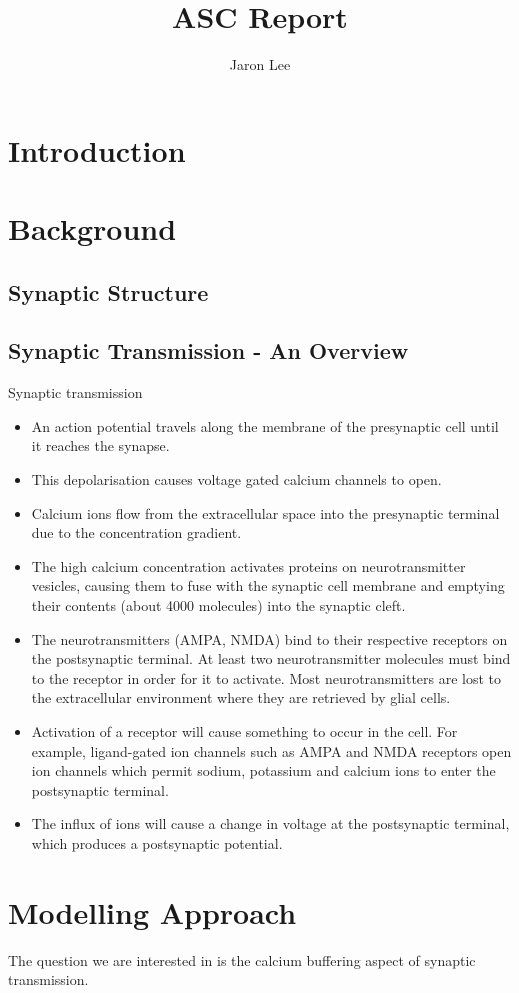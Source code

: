 \documentclass[a4paper]{article}
\title{ASC Report}
\author{Jaron Lee}
\begin{document}
\maketitle

\section{Introduction}

\section{Background}
\subsection{Synaptic Structure}


\subsection{Synaptic Transmission - An Overview}
Synaptic transmission 
\begin{itemize}
    \item An action potential travels along the membrane of the presynaptic cell until it reaches the synapse.
    \item This depolarisation causes voltage gated calcium channels to open.
    \item Calcium ions flow from the extracellular space into the presynaptic terminal due to the concentration gradient.
    \item The high calcium concentration activates proteins on neurotransmitter vesicles, causing them to fuse with the synaptic cell membrane and emptying their contents (about 4000 molecules) into the synaptic cleft.
    \item The neurotransmitters (AMPA, NMDA) bind to their respective receptors on the postsynaptic terminal. At least two neurotransmitter molecules must bind to the receptor in order for it to activate. Most neurotransmitters are lost to the extracellular environment where they are retrieved by glial cells.
    \item Activation of a receptor will cause something to occur in the cell. For example, ligand-gated ion channels such as AMPA and NMDA receptors open ion channels which permit sodium, potassium and calcium ions to enter the postsynaptic terminal.
    \item The influx of ions will cause a change in voltage at the postsynaptic terminal, which produces a postsynaptic potential.

\end{itemize}


\section{Modelling Approach}

The question we are interested in is the calcium buffering aspect of synaptic transmission.
\end{document}
